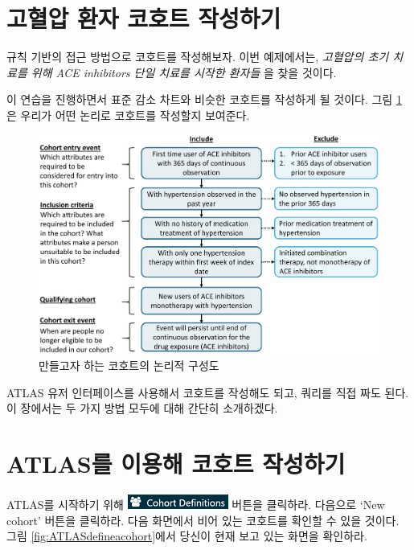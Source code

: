 \documentclass[11pt]{book}
\theoremstyle{definition}
\theoremstyle{definition}
\theoremstyle{definition}
\theoremstyle{remark}
\begin{document}
\section{고혈압 환자 코호트 작성하기}\label{---}

규칙 기반의 접근 방법으로 코호트를 작성해보자. 이번 예제에서는,
\emph{고혈압의 초기 치료를 위해 ACE inhibitors 단일 치료를 시작한
환자들} 을 찾을 것이다.

이 연습을 진행하면서 표준 감소 차트와 비슷한 코호트를 작성하게 될
것이다. 그림 \ref{fig:CohortPractice}은 우리가 어떤 논리로 코호트를
작성할지 보여준다.

\begin{figure}

{\centering \includegraphics[width=1\linewidth]{images/Cohorts/CohortPractice} 

}

\caption{만들고자 하는 코호트의 논리적 구성도}\label{fig:CohortPractice}
\end{figure}

ATLAS 유저 인터페이스를 사용해서 코호트를 작성해도 되고, 쿼리를 직접
짜도 된다. 이 장에서는 두 가지 방법 모두에 대해 간단히 소개하겠다.

\section{ATLAS를 이용해 코호트 작성하기}\label{atlas---}

ATLAS를 시작하기 위해
\includegraphics{images/Cohorts/cohortdefinition.png} 버튼을 클릭하라.
다음으로 `New cohort' 버튼을 클릭하라. 다음 화면에서 비어 있는 코호트를
확인할 수 있을 것이다. 그림 \ref{fig:ATLASdefineacohort}에서 당신이 현재
보고 있는 화면을 확인하라.
\end{document}
